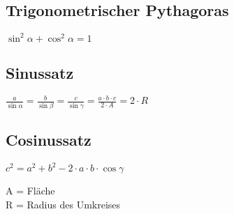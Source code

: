 	\subsection{Trigonometrischer Pythagoras}
		\begin{emphbox}
			$ \sin ^2 \alpha + \cos ^2 \alpha = 1 $
		\end{emphbox}
		
	\subsection{Sinussatz}
		\begin{emphbox}
			$ \frac{a}{\sin \alpha} = \frac{b}{\sin \beta} = \frac{c}{\sin \gamma} = \frac{a \cdot b \cdot c}{2 \cdot A} = 2 \cdot R$
		\end{emphbox}

	\subsection{Cosinussatz}
		\begin{emphbox}
			$ c^2 = a^2 + b^2 - 2 \cdot a \cdot b \cdot \cos \gamma $
		\end{emphbox}

\begin{symbolbox}
	A = Fläche\\
	R = Radius des Umkreises
\end{symbolbox}




